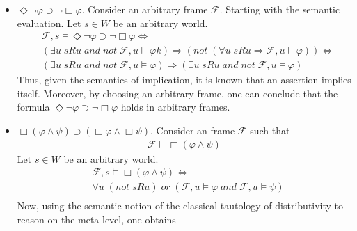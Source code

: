 \documentclass[11pt,a4paper]{article}
\newcommand{\lto}{\supset}
\newcommand{\some}{\Diamond}
\newcommand{\all}{\Box}
\newcommand{\sand}{\; and \;}
\newcommand{\sor}{ \; or \;}
\newcommand{\sneg}{not \;}
\newcommand{\sto}{\Rightarrow}
\begin{document}
\begin{itemize}
\item $\some \neg \varphi \lto  \neg \all  \varphi$. Consider an arbitrary frame $\mathcal{F}$. Starting with the semantic evaluation. Let $s \in W$ be an arbitrary world.
\begin{equation*}
\begin{split}
&\mathcal{F},s \models \some \neg \varphi \lto  \neg \all  \varphi \iff \\
& (\exists u \; sRu \sand \sneg \mathcal{F},u \models \varphi k)\sto (\sneg (\forall u \; sRu \sto \mathcal{F},u \models \varphi)) \iff \\
& (\exists u \; sRu \sand \sneg \mathcal{F},u \models \varphi )\sto (\exists u \;  sRu \sand \sneg \mathcal{F},u \models \varphi) 
\end{split}
\end{equation*} 
Thus, given the semantics of implication, it is known that an assertion implies itself. Moreover, by choosing an arbitrary frame, one can conclude that the formula $\some \neg \varphi \lto  \neg \all  \varphi$ holds in arbitrary frames.


\item $\all (\varphi \land \psi) \lto (\all \varphi \land \all \psi)$. Consider an frame $\mathcal{F}$ such that 
\begin{equation*}
\begin{split}
\mathcal{F} \models \all (\varphi \land \psi)
\end{split}
\end{equation*} 
Let $s \in W$ be an arbitrary world. 
\begin{equation*}
\begin{split}
&\mathcal{F},s \models \all (\varphi \land \psi) \iff  \\
&\forall u \; ( \sneg sRu) \sor (\mathcal{F},u \models \varphi \sand \mathcal{F},u \models \psi) \\
\end{split}
\end{equation*} 
Now, using the semantic notion of the classical tautology of distributivity to reason on the meta level, one obtains 


\end{itemize}
\end{document}
